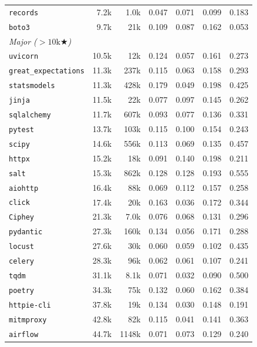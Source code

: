 \begin{table}[h]
\begin{tabular}{lrrcccc}
        \texttt{records} & 7.2k & 1.0k & 0.047 & 0.071 & 0.099 & 0.183 \\
        \texttt{boto3} & 9.7k & 21k & 0.109 & 0.087 & 0.162 & 0.053 \\
        \midrule
        \multicolumn{7}{l}{\textit{Major ($> 10\text{k}\bigstar$)}} \\
        \texttt{uvicorn} & 10.5k & 12k & 0.124 & 0.057 & 0.161 & 0.273 \\
        \texttt{great\_expectations} & 11.3k & 237k & 0.115 & 0.063 & 0.158 & 0.293 \\
        \texttt{statsmodels} & 11.3k & 428k & 0.179 & 0.049 & 0.198 & 0.425 \\
        \texttt{jinja} & 11.5k & 22k & 0.077 & 0.097 & 0.145 & 0.262 \\
        \texttt{sqlalchemy} & 11.7k & 607k & 0.093 & 0.077 & 0.136 & 0.331 \\
        \texttt{pytest} & 13.7k & 103k & 0.115 & 0.100 & 0.154 & 0.243 \\
        \texttt{scipy} & 14.6k & 556k & 0.113 & 0.069 & 0.135 & 0.457 \\
        \texttt{httpx} & 15.2k & 18k & 0.091 & 0.140 & 0.198 & 0.211 \\
        \texttt{salt} & 15.3k & 862k & 0.128 & 0.128 & 0.193 & 0.555 \\
        \texttt{aiohttp} & 16.4k & 88k & 0.069 & 0.112 & 0.157 & 0.258 \\
        \texttt{click} & 17.4k & 20k & 0.163 & 0.036 & 0.172 & 0.344 \\
        \texttt{Ciphey} & 21.3k & 7.0k & 0.076 & 0.068 & 0.131 & 0.296 \\
        \texttt{pydantic} & 27.3k & 160k & 0.134 & 0.056 & 0.171 & 0.288 \\
        \texttt{locust} & 27.6k & 30k & 0.060 & 0.059 & 0.102 & 0.435 \\
        \texttt{celery} & 28.3k & 96k & 0.062 & 0.061 & 0.107 & 0.241 \\
        \texttt{tqdm} & 31.1k & 8.1k & 0.071 & 0.032 & 0.090 & 0.500 \\
        \texttt{poetry} & 34.3k & 75k & 0.132 & 0.060 & 0.162 & 0.384 \\
        \texttt{httpie-cli} & 37.8k & 19k & 0.134 & 0.030 & 0.148 & 0.191 \\
        \texttt{mitmproxy} & 42.8k & 82k & 0.115 & 0.041 & 0.141 & 0.363 \\
        \texttt{airflow} & 44.7k & 1148k & 0.071 & 0.073 & 0.129 & 0.240 \\

\end{tabular}
\end{table}
